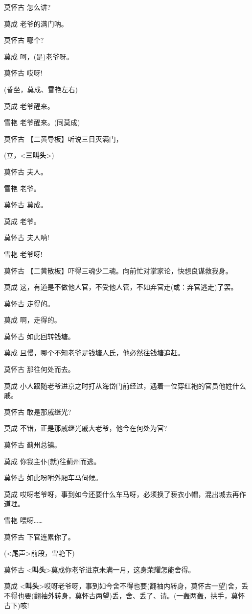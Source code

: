 莫怀古 怎么讲?

莫成 老爷的满门呐。

莫怀古 哪个?

莫成 呵，(是)老爷呀。

莫怀古 哎呀!

(昏坐，莫成、雪艳左右)

莫成 老爷醒来。

雪艳 老爷醒来。(同莫成)

莫怀古 【二黄导板】听说三日灭满门，

(立，\textless{}\textbf{三叫头}\textgreater{})

莫怀古 夫人。

雪艳 老爷。

莫怀古 莫成。

莫成 老爷。

莫怀古 夫人呐!

雪艳 老爷呀!

莫怀古 【二黄散板】吓得三魂少二魂。向前忙对掌家论，快想良谋救我身。

莫成 这，有道是不做他人官，不受他人管，不如弃官走(或：弃官逃走)了罢。

莫怀古 走得的。

莫成 啊，走得的。

莫怀古 如此回转钱塘。

莫成 且慢，哪个不知老爷是钱塘人氏，他必然往钱塘追赶。

莫怀古 那往何处而去。

莫成
小人跟随老爷进京之时打从海岱门前经过，遇着一位穿红袍的官员他姓什么戚。

莫怀古 敢是那戚继光?

莫成 不错，正是那戚继光戚大老爷，他今在何处为官?

莫怀古 蓟州总镇。

莫成 你我主仆(就)往蓟州而逃。

莫怀古 如此吩咐外厢车马伺候。

莫成
哎呀老爷呀，事到如今还要什么车马呀，必须换了亵衣小帽，混出城去再作道理。

雪艳 喂呀\ldots{}\ldots{}

莫怀古 下官连累你了。

(\textless{}尾声\textgreater{}前段，雪艳下)

莫怀古
\textless{}\textbf{叫头}\textgreater{}莫成你老爷进京未满一月，这身荣耀怎能舍得。

莫成
\textless{}\textbf{叫头}\textgreater{}哎呀老爷呀，事到如今舍不得也要(翻袖内转身，莫怀古一望)舍，丢不得也要(翻袖外转身，莫怀古两望)丢，舍、丢了、请。(一轰两轰，拱手，莫怀古下)咳!

